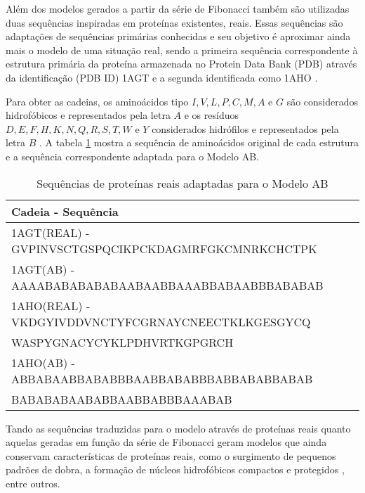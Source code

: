 \documentclass[dm,ppgcomp]{texfurg}
\begin{document}
Além dos modelos gerados a partir da série de Fibonacci também são utilizadas duas sequências inspiradas em proteínas existentes, reais. Essas sequências são adaptações de sequências primárias conhecidas e seu objetivo é aproximar ainda mais o modelo de uma situação real, sendo a primeira sequência correspondente à estrutura primária da proteína armazenada no Protein Data Bank (PDB) através da identificação (PDB ID) 1AGT e a segunda identificada como 1AHO \cite{berman2000protein}. 

Para obter as cadeias, os aminoácidos tipo $I, V, L, P, C, M, A$ e $G$ são considerados hidrofóbicos e representados pela letra $A$ e os resíduos $D, E, F, H, K, N, Q, R, S, T, W$ e $Y$ considerados hidrófilos e representados pela letra $B$ \cite{mount2004sequence}. A tabela \ref{tabelareal} mostra a sequência de aminoácidos original de cada estrutura e a sequência correspondente adaptada para o Modelo AB.

\begin{table}
\begin{center}
\caption{Sequências de proteínas reais adaptadas para o Modelo AB}\label{tabelareal}
\begin{tabular}{l}
\hline
Cadeia - Sequência \\
\hline
1AGT(REAL) - GVPINVSCTGSPQCIKPCKDAGMRFGKCMNRKCHCTPK\\
1AGT(AB)\hspace{15 pt} - AAAABABABABABAABAABBAAABBABAABBBABABAB\\
1AHO(REAL) - VKDGYIVDDVNCTYFCGRNAYCNEECTKLKGESGYCQ\\
\hspace{80 pt}WASPYGNACYCYKLPDHVRTKGPGRCH\\
1AHO(AB)\hspace{15 pt} - ABBABAABBABABBBAABBABABBBABBABABBABAB\\
\hspace{80 pt}BABABABAABABBAABBABBBAAABAB\\
\hline
\end{tabular}
\end{center}
\end{table}

Tando as sequências traduzidas para o modelo através de proteínas reais quanto aquelas geradas em função da série de Fibonacci geram modelos que ainda conservam características de proteínas reais, como o surgimento de pequenos padrões de dobra, a formação de núcleos hidrofóbicos compactos e protegidos \cite{fraenkel1993complexity}, entre outros. 
\end{document}
